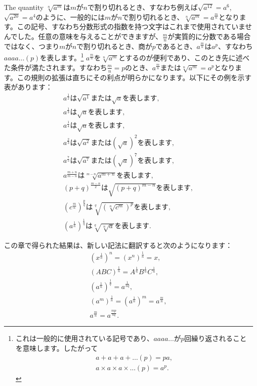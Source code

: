 \documentclass[a4paper,11pt,openany]{ltjsbook}
\begin{document}
The quantity $\sqrt[n]{a^{m}}$は$m$が$n$で割り切れるとき、すなわち例えば$\sqrt{a^{12}} = a^{6}$, $\sqrt{a^{20}} = a^{4}$のように、一般的には$m$が$n$で割り切れるとき、$\sqrt[n]{a^{m}} = a^{\frac{m}{n}}$となります。この記号、すなわち分数形式の指数を持つ文字はこれまで使用されていませんでした。任意の意味を与えることができますが、$\frac{m}{n}$が実質的に分数である場合ではなく、つまり$m$が$n$で割り切れるとき、商が$p$であるとき、$a^{\frac{m}{n}}$は$a^{p}$、すなわち$aaaa\dots (p)$を表します。\footnote{これは一般的に使用されている記号であり、$aaaa\dots$が$p$回繰り返されることを意味します。したがって
\begin{gather*}
a + a + a + \dots (p) = pa, \\
a × a × a × \dots (p) = a^{p}.
\end{gather*}}
$a^{\frac{m}{n}}$を$\sqrt[n]{a^{m}}$とするのが便利であり、このとき先に述べた条件が満たされます。すなわち$\frac{m}{n} = p$のとき、$a^{\frac{m}{n}}$または$\sqrt[n]{a^{m}} = a^{p}$となります。この規則の拡張は直ちにその利点が明らかになります。以下にその例を示す表があります：
\begin{gather*}
a^{\frac{1}{2}}\text{は}\sqrt{a^{1}}\text{または}\sqrt{a}\text{を表します}, \\
a^{\frac{1}{3}}\text{は}\sqrt{a}\text{を表します}, \\
a^{\frac{1}{4}}\text{は}\sqrt{a}\text{を表します}, \\
a^{\frac{2}{3}}\text{は}\sqrt{a^{2}}\text{または}(\sqrt{a})^{2}\text{を表します}, \\
a^{\frac{7}{5}}\text{は}\sqrt{a^{7}}\text{または}(\sqrt{a})^{7}\text{を表します}, \\
a^{\frac{m+n}{m-n}}\text{は}\sqrt[m-n]{a^{m+n}}\text{を表します}, \\
(p + q)^{\frac{m-n}{2}}\text{は}\sqrt{(p + q)^{m-n}}\text{を表します}, \\
(c^{\frac{m}{n}})^{\frac{p}{q}}\text{は}\sqrt[q]{(\sqrt[n]{c^{m}})^{p}}\text{を表します}, \\
(a^{\frac{1}{n}})^{\frac{1}{q}}\text{は}\sqrt[q]{\sqrt[n]{a}}\text{を表します}.
\end{gather*}

この章で得られた結果は、新しい記法に翻訳すると次のようになります：
\begin{gather*}
(x^{\frac{1}{n}})^{n} = (x^{n})^{\frac{1}{n}} = x, \tag{1} \\
(ABC)^{\frac{1}{n}} = A^{\frac{1}{n}} B^{\frac{1}{n}} C^{\frac{1}{n}}, \tag{2} \\
(a^{\frac{1}{n}})^{\frac{1}{q}} = a^{\frac{1}{nq}}, \tag{3} \\
(a^{m})^{\frac{1}{n}} = (a^{\frac{1}{n}})^{m} = a^{\frac{m}{n}}, \tag{4} \\
a^{\frac{m}{n}} = a^{\frac{mp}{nq}}. \tag{5}
\end{gather*}
\end{document}
